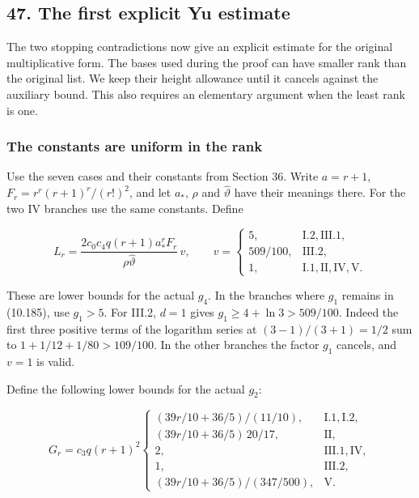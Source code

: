 \documentclass[
  11pt,
  a4paper,
]{article}
\begin{document}
\subsection{47. The first explicit Yu
estimate}\label{the-first-explicit-yu-estimate}

The two stopping contradictions now give an explicit estimate for the
original multiplicative form. The bases used during the proof can have
smaller rank than the original list. We keep their height allowance
until it cancels against the auxiliary bound. This also requires an
elementary argument when the least rank is one.

\subsubsection{The constants are uniform in the
rank}\label{the-constants-are-uniform-in-the-rank}

Use the seven cases and their constants from Section 36. Write
\(a=r+1\), \(F_r=r^r(r+1)^r/(r!)^2\), and let \(a_*\), \(\rho\) and
\(\widehat\vartheta\) have their meanings there. For the two IV branches
use the same constants. Define

\[
L_r=\frac{2c_0c_4q(r+1)a_*^rF_r}{\rho\widehat\vartheta}\,v,
\qquad
v=\begin{cases}
5,&\mathrm{I.2,III.1},\\
509/100,&\mathrm{III.2},\\
1,&\mathrm{I.1,II,IV,V}.
\end{cases}
\tag{10.442}
\]

These are lower bounds for the actual \(g_4\). In the branches where
\(g_1\) remains in (10.185), use \(g_1>5\). For III.2, \(d=1\) gives
\(g_1\ge4+\ln3>509/100\). Indeed the first three positive terms of the
logarithm series at \((3-1)/(3+1)=1/2\) sum to \(1+1/12+1/80>109/100\).
In the other branches the factor \(g_1\) cancels, and \(v=1\) is valid.

Define the following lower bounds for the actual \(g_2\):

\[
G_r=c_3q(r+1)^2
\begin{cases}
(39r/10+36/5)/(11/10),&\mathrm{I.1,I.2},\\
(39r/10+36/5)\,20/17,&\mathrm{II},\\
2,&\mathrm{III.1,IV},\\
1,&\mathrm{III.2},\\
(39r/10+36/5)/(347/500),&\mathrm V.
\end{cases}
\tag{10.443}
\]
\end{document}
